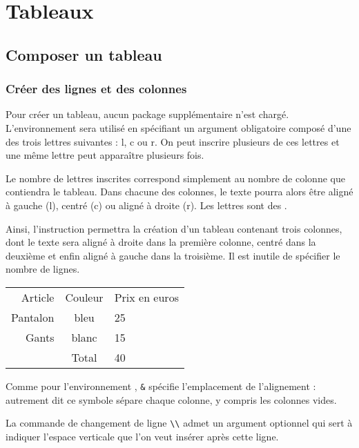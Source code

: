 \renewcommand\MaCouleur{Orange}
\chapter{Tableaux}
\thispagestyle{empty}

\section{Composer un tableau}
\subsection{Créer des lignes et des colonnes}

Pour créer un tableau, aucun package supplémentaire n'est chargé.
L'environnement  sera utilisé en spécifiant un argument obligatoire composé d'une des trois lettres suivantes : \ordi l, \ordi c ou \ordi r. On peut inscrire plusieurs de ces lettres et une même lettre peut apparaître plusieurs fois.

Le nombre de lettres inscrites correspond simplement au nombre de colonne que contiendra le tableau. Dans chacune des colonnes, le texte pourra alors être aligné à gauche (\ordi l), centré (\ordi c) ou aligné à droite (\ordi r). Les lettres sont des .

Ainsi, l'instruction  permettra la création d'un tableau contenant trois colonnes, dont le texte sera aligné à droite dans la première colonne, centré dans la deuxième et enfin aligné à gauche dans la troisième. Il est inutile de spécifier le nombre de lignes.\bigskip

{\NewFont
\begin{SideBySideExample}
    \begin{tabular}{rcl}
        Article & Couleur & Prix en euros \\[0.5cm]
        Pantalon & bleu & 25 \\
        Gants & blanc & 15 \\
            & Total & 40
    \end{tabular}
\end{SideBySideExample}
}\bigskip

Comme pour l'environnement , \verb!&! spécifie l'emplacement de l'alignement : autrement dit ce symbole sépare chaque colonne, y compris les colonnes vides.

La commande de changement de ligne \verb!\\! admet un argument optionnel qui sert à indiquer l'espace verticale que l'on veut insérer après cette ligne.

